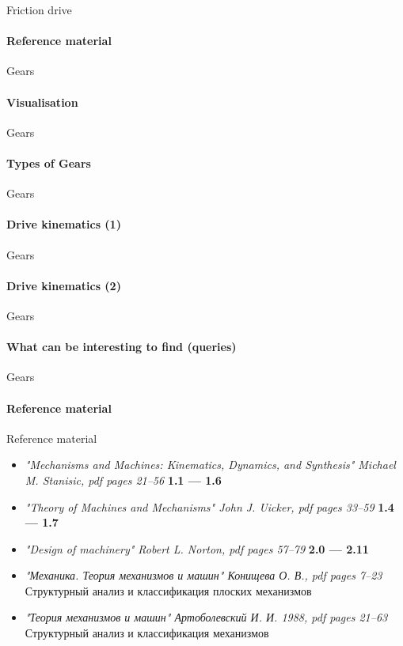 \documentclass[aspectratio=169]{beamer}
\newcommand{\fbckg}[1]{\usebackgroundtemplate{\texttt{[image: \#1]}}}%
\begin{document}
\begin{frame}[t]{Friction drive}
    \framesubtitle{Reference material}

\end{frame}

\begin{frame}[t]{Gears}
    \framesubtitle{Visualisation}

\end{frame}

\begin{frame}[t]{Gears}
    \framesubtitle{Types of Gears}

\end{frame}

\begin{frame}[t]{Gears}
    \framesubtitle{Drive kinematics (1)}

\end{frame}

\begin{frame}[t]{Gears}
    \framesubtitle{Drive kinematics (2)}

\end{frame}

\begin{frame}[t]{Gears}
    \framesubtitle{What can be interesting to find (queries)}

\end{frame}

\begin{frame}[t]{Gears}
    \framesubtitle{Reference material}

\end{frame}



\begin{frame}[t]{Reference material}
    \begin{itemize}
        \item \textit{"Mechanisms and Machines: Kinematics, Dynamics, and Synthesis" Michael M. Stanisic, pdf pages 21--56 } \textbf{1.1 --- 1.6}
        \item \textit{"Theory of Machines and Mechanisms" John J. Uicker, pdf pages 33--59 } \textbf{1.4 --- 1.7}
        \item \textit{"Design of machinery" Robert L. Norton, pdf pages 57--79 } \textbf{2.0 --- 2.11}
        \item \textit{"Механика. Теория механизмов и машин" Конищева О. В., pdf pages 7--23 } \\ Структурный анализ и классификация плоских механизмов
        \item \textit{"Теория механизмов и машин" Артоболевский И. И. 1988, pdf pages 21--63 } \\ Структурный анализ и классификация механизмов
    \end{itemize}
\end{frame}

\fbckg{fibeamer/figs/last_page.png}
\frame[plain]{}
\end{document}
